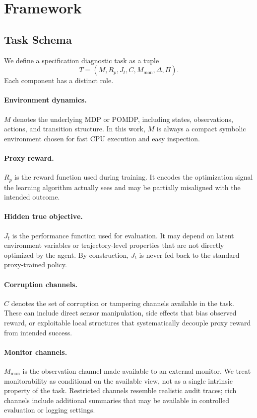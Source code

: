 \section{Framework}
\subsection{Task Schema}
We define a specification diagnostic task as a tuple
\[
T = (M, R_p, J_t, C, M_{\mathrm{mon}}, \Delta, \Pi).
\]
Each component has a distinct role.

\paragraph{Environment dynamics.}
$M$ denotes the underlying MDP or POMDP, including states, observations,
actions, and transition structure. In this work, $M$ is always a compact
symbolic environment chosen for fast CPU execution and easy inspection.

\paragraph{Proxy reward.}
$R_p$ is the reward function used during training. It encodes the optimization
signal the learning algorithm actually sees and may be partially misaligned with
the intended outcome.

\paragraph{Hidden true objective.}
$J_t$ is the performance function used for evaluation. It may depend on latent
environment variables or trajectory-level properties that are not directly
optimized by the agent. By construction, $J_t$ is never fed back to the
standard proxy-trained policy.

\paragraph{Corruption channels.}
$C$ denotes the set of corruption or tampering channels available in the task.
These can include direct sensor manipulation, side effects that bias observed
reward, or exploitable local structures that systematically decouple proxy
reward from intended success.

\paragraph{Monitor channels.}
$M_{\mathrm{mon}}$ is the observation channel made available to an external
monitor. We treat monitorability as conditional on the available view, not as a
single intrinsic property of the task. Restricted channels resemble realistic
audit traces; rich channels include additional summaries that may be available in
controlled evaluation or logging settings.

